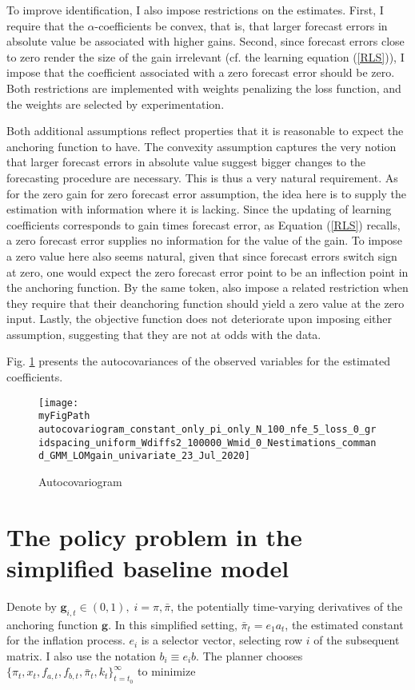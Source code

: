 \documentclass[11pt]{article}
\def \myFigPath {../../figures/}
\renewcommand{\[}{\begin{equation}}
\renewcommand{\]}{\end{equation}}
\begin{document}
To improve identification, I also impose restrictions on the estimates. First, I require that the $\alpha$-coefficients be convex, that is, that larger forecast errors in absolute value be associated with higher gains. Second, since forecast errors close to zero render the size of the gain irrelevant (cf. the learning equation (\ref{RLS})), I impose that the coefficient associated with a zero forecast error should be zero. Both restrictions are implemented with weights penalizing the loss function, and the weights are selected by experimentation. 

Both additional assumptions reflect properties that it is reasonable to expect the anchoring function to have. The convexity assumption captures the very notion that larger forecast errors in absolute value suggest bigger changes to the forecasting procedure are necessary. This is thus a very natural requirement. As for the zero gain for zero forecast error assumption, the idea here is to supply the estimation with information where it is lacking. Since the updating of learning coefficients corresponds to gain times forecast error, as Equation (\ref{RLS}) recalls, a zero forecast error supplies no information for the value of the gain. To impose a zero value here also seems natural, given that since forecast errors switch sign at zero, one would expect the zero forecast error point to be an inflection point in the anchoring function. By the same token, \cite{gobbi2019monetary} also impose a related restriction when they require that their deanchoring function should yield a zero value at the zero input. Lastly, the objective function does not deteriorate upon imposing either assumption, suggesting that they are not at odds with the data.

Fig. \ref{autocovariogram} presents the autocovariances of the observed variables for the estimated coefficients. 

\begin{figure}[h!]
\texttt{[image: \\myFigPath autocovariogram\_constant\_only\_pi\_only\_N\_100\_nfe\_5\_loss\_0\_gridspacing\_uniform\_Wdiffs2\_100000\_Wmid\_0\_Nestimations\_command\_GMM\_LOMgain\_univariate\_23\_Jul\_2020]}
\caption{Autocovariogram}
\label{autocovariogram}
\end{figure}


\section{The policy problem in the simplified baseline model }\label{app_midsimple_problem}
Denote by $\mathbf{g}_{i,t} \in (0,1), \; i=\pi, \bar{\pi}$, the potentially time-varying derivatives of the anchoring function $\mathbf{g}$. In this simplified setting, $\bar{\pi}_t = e_1 a_t$, the estimated constant for the inflation process. $e_i$ is a selector vector, selecting row $i$ of the subsequent matrix. I also use the notation $b_i \equiv e_i b$.   The planner chooses $\{\pi_t, x_t, f_{a,t},  f_{b,t}, \bar{\pi}_t, k_t\}_{t=t_0}^{\infty}$ to minimize
\end{document}

